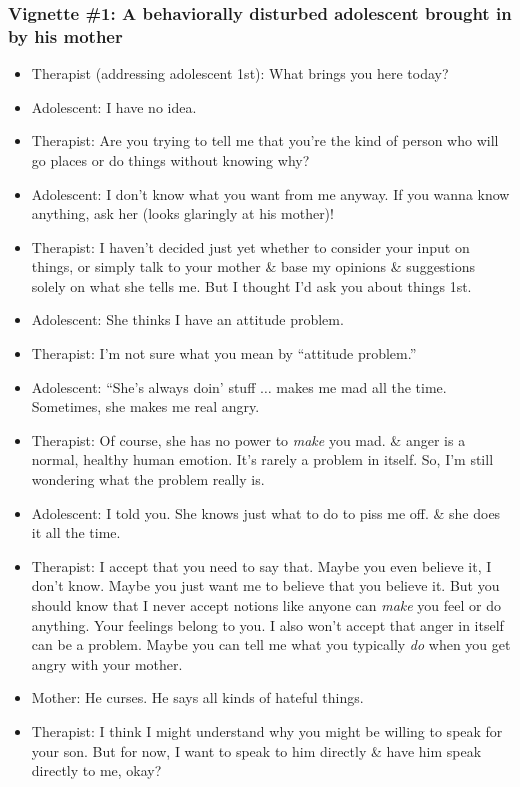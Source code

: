 \documentclass{article}
\numberwithin{equation}{section}
\begin{document}
\subsubsection{Vignette \#1: A behaviorally disturbed adolescent brought in by his mother}
\begin{itemize}
	\item Therapist (addressing adolescent 1st): What brings you here today?
	\item Adolescent: I have no idea.
	\item Therapist: Are you trying to tell me that you're the kind of person who will go places or do things without knowing why?
	\item Adolescent: I don't know what you want from me anyway. If you wanna know anything, ask her (looks glaringly at his mother)!
	\item Therapist: I haven't decided just yet whether to consider your input on things, or simply talk to your mother \& base my opinions \& suggestions solely on what she tells me. But I thought I'd ask you about things 1st.
	\item Adolescent: She thinks I have an attitude problem.
	\item Therapist: I'm not sure what you mean by ``attitude problem.''
	\item Adolescent: ``She's always doin' stuff $\ldots$ makes me mad all the time. Sometimes, she makes me real angry.
	\item Therapist: Of course, she has no power to \textit{make} you mad. \& anger is a normal, healthy human emotion. It's rarely a problem in itself. So, I'm still wondering what the problem really is.
	\item Adolescent: I told you. She knows just what to do to piss me off. \& she does it all the time.
	\item Therapist: I accept that you need to say that. Maybe you even believe it, I don't know. Maybe you just want me to believe that you believe it. But you should know that I never accept notions like anyone can \textit{make} you feel or do anything. Your feelings belong to you. I also won't accept that anger in itself can be a problem. Maybe you can tell me what you typically \textit{do} when you get angry with your mother.
	\item Mother: He curses. He says all kinds of hateful things.
	\item Therapist: I think I might understand why you might be willing to speak for your son. But for now, I want to speak to him directly \& have him speak directly to me, okay?

\end{itemize}
\end{document}
